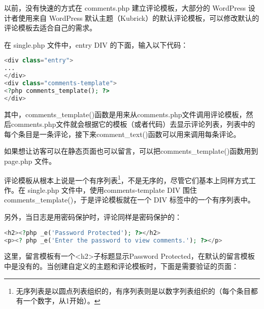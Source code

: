 以前，没有快速的方式在 comments.php 建立评论模板，大部分的 WordPress 设计者使用来自 WordPress 默认主题（Kubrick）的默认评论模板，可以修改默认的评论模板去适合自己的需求。



在 single.php 文件中，entry DIV 的下面，输入以下代码：

\begin{lstlisting}[language=PHP]
<div class="entry">
...
</div>
<div class="comments-template">
<?php comments_template(); ?>
</div>
\end{lstlisting}

其中，comments\_template()函数是用来从comments.php文件调用评论模板，然后comments.php文件就会根据它的模板（或者代码）去显示评论列表，列表中的每个条目是一条评论，接下来comment\_text()函数可以用来调用每条评论。

如果想让访客可以在静态页面也可以留言，可以把comments\_template()函数用到 page.php 文件。

评论模板从根本上说是一个有序列表\footnote{无序列表是以圆点列表组织的，有序列表则是以数字列表组织的（每个条目都有一个数字，从1开始）。}，不是无序的，尽管它们基本上同样方式工作。在 single.php 文件中，使用comments-template DIV 围住comments\_template()，于是评论模板就在一个 DIV 标签中的一个有序列表中。 

另外，当日志是用密码保护时，评论同样是密码保护的：

\begin{lstlisting}[language=PHP]
<h2><?php _e('Password Protected'); ?></h2>
<p><? php _e('Enter the password to view comments.'); ?></p>
\end{lstlisting}


这里，留言模板有一个<h2>子标题显示Password Protected，在默认的留言模板中是没有的。当创建自定义的主题和评论模板时，下面是需要验证的页面：


